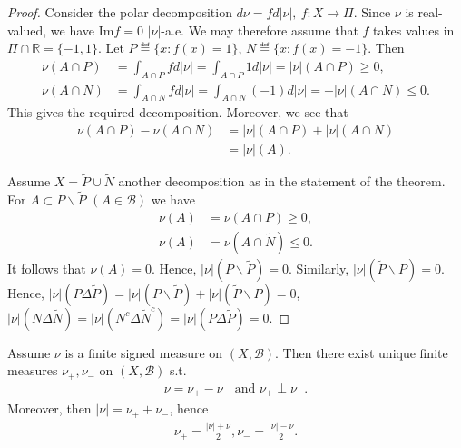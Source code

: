 \begin{proof}
    Consider the polar decomposition \(d\nu = fd|\nu|, \ f:X\rightarrow\Pi\). Since \(\nu\) is real-valued, we have Im\(f=0\) \(|\nu|\)-a.e. We may therefore assume that \(f\) takes values in \(\Pi\cap\mathbb{R}=\{-1,1\}\). Let \(P\eqdef\{x:f(x)=1\}\), \(N\eqdef\{x:f(x)=-1\}\). Then
    \begin{align*}
        \nu\left(A\cap P\right) &= \int_{A\cap P}fd|\nu| = \int_{A\cap P}1d|\nu| = |\nu|\left(A\cap P\right) \geq 0, \\
        \nu\left(A\cap N\right) &= \int_{A\cap N} fd|\nu| = \int_{A\cap N}(-1)d|\nu| = -|\nu|\left(A\cap N\right) \leq 0.
    \end{align*}
    This gives the required decomposition. Moreover, we see that
    \begin{align*}
        \nu\left(A\cap P\right) - \nu\left(A\cap N\right) &= |\nu|\left(A\cap P\right) + |\nu|\left(A\cap N\right) \\
        &= |\nu|(A).
    \end{align*}

    Assume \(X=\tilde{P}\cup\tilde{N}\) another decomposition as in the statement of the theorem. For \(A\subset P\backslash\tilde{P}\) \((A\in\mathscr{B})\) we have
    \begin{align*}
        \nu(A) &= \nu\left(A\cap P\right) \geq 0,\\
        \nu(A) &= \nu\left(A\cap\tilde{N}\right)\leq 0.
    \end{align*}
    It follows that \(\nu(A)=0\). Hence, \(|\nu|(P\backslash\tilde{P})=0\). Similarly, \(|\nu|(\tilde{P}\backslash P)=0\). Hence, \(|\nu|(P\Delta\tilde{P}) = |\nu|(P\backslash\tilde{P}) + |\nu|(\tilde{P}\backslash P) = 0\), \(|\nu|(N\Delta\tilde{N})=|\nu|(N^c\Delta\tilde{N}^c) = |\nu|(P\Delta\tilde{P})=0\).
\end{proof}
\fi 
\begin{corollary}
    Assume \(\nu\) is a finite signed measure on \((X,\mathscr{B})\). Then there exist unique finite measures \(\nu_+,\nu_{-}\) on \((X,\mathscr{B})\) s.t. 
    \begin{align*}
        \nu = \nu_+ - \nu_{-} \text{ and } \nu_+ \perp \nu_-.
    \end{align*}
    Moreover, then \(|\nu| = \nu_+ + \nu_-\), hence 
    \begin{align*}
        \nu_+ = \frac{|\nu| + \nu}{2}, \nu_- = \frac{|\nu| - \nu}{2}.
    \end{align*}
\end{corollary}

